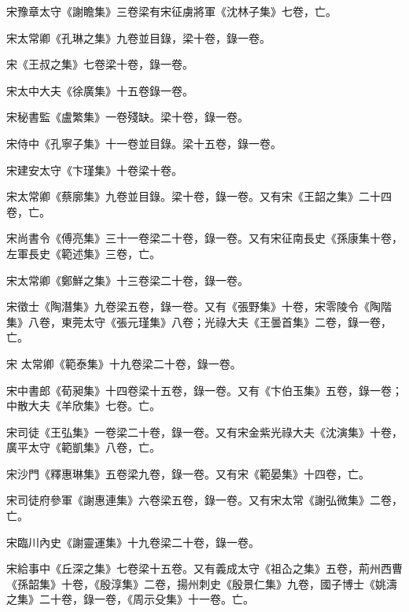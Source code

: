 \begin{pinyinscope}
 宋豫章太守《謝瞻集》三卷梁有宋征虜將軍《沈林子集》七卷，亡。



 宋太常卿《孔琳之集》九卷並目錄，梁十卷，錄一卷。



 宋《王叔之集》七卷梁十卷，錄一卷。



 宋太中大夫《徐廣集》十五卷錄一卷。



 宋秘書監《盧繁集》一卷殘缺。梁十卷，錄一卷。



 宋侍中《孔寧子集》十一卷並目錄。梁十五卷，錄一卷。



 宋建安太守《卞瑾集》十卷梁十卷。



 宋太常卿《蔡廓集》九卷並目錄。梁十卷，錄一卷。又有宋《王韶之集》二十四卷，亡。



 宋尚書令《傅亮集》三十一卷梁二十卷，錄一卷。又有宋征南長史《孫康集十卷，左軍長史《範述集》三卷，亡。



 宋太常卿《鄭鮮之集》十三卷梁二十卷，錄一卷。



 宋徵士《陶潛集》九卷梁五卷，錄一卷。又有《張野集》十卷，宋零陵令《陶階集》八卷，東莞太守《張元瑾集》八卷；光祿大夫《王曇首集》二卷，錄一卷，亡。



 宋
 太常卿《範泰集》十九卷梁二十卷，錄一卷。



 宋中書郎《荀昶集》十四卷梁十五卷，錄一卷。又有《卞伯玉集》五卷，錄一卷；中散大夫《羊欣集》七卷。亡。



 宋司徒《王弘集》一卷梁二十卷，錄一卷。又有宋金紫光祿大夫《沈演集》十卷，廣平太守《範凱集》八卷，亡。



 宋沙門《釋惠琳集》五卷梁九卷，錄一卷。又有宋《範晏集》十四卷，亡。



 宋司徒府參軍《謝惠連集》六卷梁五卷，錄一卷。又有宋太常《謝弘微集》二卷，亡。



 宋臨川內史《謝靈運集》十九卷梁二十卷，錄一卷。



 宋給事中《丘深之集》七卷梁十五卷。又有義成太守《祖屳之集》五卷，荊州西曹《孫韶集》十卷，《殷淳集》二卷，揚州刺史《殷景仁集》九卷，國子博士《姚濤之集》二十卷，錄一卷，《周示殳集》十一卷。亡。




\end{pinyinscope}
